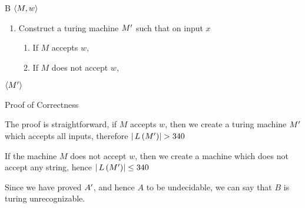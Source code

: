 \documentclass{article}
\begin{document}
\begin{question}
\begin{qpart}{B}
		 $\left\langle M, w \right\rangle$
		\begin{enumerate}[label = (\alph*) ]
			\item Construct a turing machine $M^{\prime}$ such that on input $x$
				\begin{enumerate}[label = (\alph*)]
					\item If $M$ accepts $w$, 
					\item If $M$ does not accept $w$, 
				\end{enumerate}
		\end{enumerate}
		 $\left\langle M^{\prime} \right\rangle$

		\begin{qsubsection}{Proof of Correctness}

			The proof is straightforward, if $M$ accepts $w$, then we create a turing machine $M^{\prime}$ which accepts all inputs, therefore $\abs{\func{L}{\pr{M}}} > 340$ \br%

			If the machine $M$ does not accept $w$, then we create a machine which does not accept any string, hence $\abs{\func{L}{\pr{M}}} \le 340$

		\end{qsubsection}

		Since we have proved $A^{\prime}$, and hence $A$ to be undecidable, we can say that $B$ is turing unrecognizable.

	\end{qpart}

\end{question}
\end{document}
